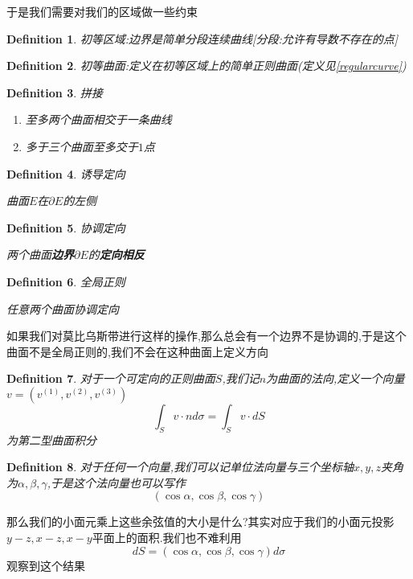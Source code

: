 \documentclass[11pt,hyperref,a4paper,UTF8]{ctexart}
\newtheorem{definition}{Definition}[subsection]
\begin{document}
\begin{CJK}{UTF8}{gkai}
于是我们需要对我们的区域做一些约束

\begin{definition}
  初等区域:边界是简单分段连续曲线[分段:允许有导数不存在的点]
\end{definition}

\begin{definition}
  初等曲面:定义在初等区域上的简单正则曲面(定义见\ref{regularcurve})
\end{definition}

\begin{definition}
  拼接

  \begin{enumerate}
    \item 至多两个曲面相交于一条曲线
    \item 多于三个曲面至多交于$1$点
  \end{enumerate}
\end{definition}

\begin{definition}
  诱导定向

  曲面$E$在$\partial E$的左侧
\end{definition}

\begin{definition}
  协调定向

  两个曲面\textbf{边界}$\partial E$的\textbf{定向相反}
\end{definition}

\begin{definition}
  全局正则

  任意两个曲面协调定向
\end{definition}

如果我们对莫比乌斯带进行这样的操作,那么总会有一个边界不是协调的,于是这个曲面不是全局正则的,我们不会在这种曲面上定义方向

\begin{definition}
  对于一个可定向的正则曲面$S$,我们记$n$为曲面的法向,定义一个向量$v = (v^{(1)},v^{(2)},v^{(3)})$
  \[\int_S v \cdot n d\sigma = \int_S v \cdot dS\]
  为第二型曲面积分
\end{definition}

\begin{definition}
  对于任何一个向量,我们可以记单位法向量与三个坐标轴$x,y,z$夹角为$\alpha,\beta,\gamma$,于是这个法向量也可以写作
  \[(\cos \alpha,\cos \beta,\cos \gamma)\]
\end{definition}

那么我们的小面元乘上这些余弦值的大小是什么?其实对应于我们的小面元投影$y-z,x-z,x-y$平面上的面积.我们也不难利用
\[dS = (\cos \alpha,\cos \beta,\cos \gamma) d\sigma\]
观察到这个结果


\end{CJK}
\end{document}
